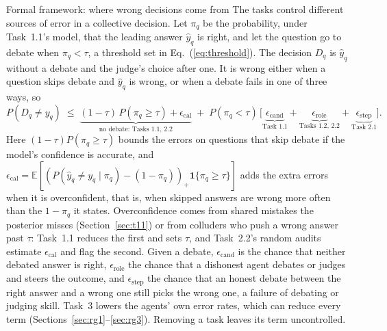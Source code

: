 \documentclass[12pt,letterpaper]{article}
\begin{document}
\begin{keybox}{Formal framework: where wrong decisions come from}\label{sec:framework}%
The tasks control different sources of error in a collective decision. Let $\pi_q$ be the probability, under Task~1.1's model, that the leading answer $\hat y_q$ is right, and let the question go to debate when $\pi_q<\tau$, a threshold set in Eq.~(\ref{eq:threshold}). The decision $D_q$ is $\hat y_q$ without a debate and the judge's choice after one. It is wrong either when a question skips debate and $\hat y_q$ is wrong, or when a debate fails in one of three ways, so
\begin{equation}
P(D_q\neq y_q)\;\le\;\underbrace{(1-\tau)\,P(\pi_q\ge\tau)+\epsilon_{\text{cal}}}_{\text{no debate: Tasks 1.1, 2.2}}\;+\;P(\pi_q<\tau)\,\big[\underbrace{\epsilon_{\text{cand}}}_{\text{Task 1.1}}+\underbrace{\epsilon_{\text{role}}}_{\text{Tasks 1.2, 2.2}}+\underbrace{\epsilon_{\text{step}}}_{\text{Task 2.1}}\big].
\label{eq:decomp}
\end{equation}
Here $(1-\tau)P(\pi_q\ge\tau)$ bounds the errors on questions that skip debate if the model's confidence is accurate, and $\epsilon_{\text{cal}}=\mathbb{E}[(P(\hat y_q\neq y_q\mid\pi_q)-(1-\pi_q))_+\mathbf{1}\{\pi_q\ge\tau\}]$ adds the extra errors when it is overconfident, that is, when skipped answers are wrong more often than the $1-\pi_q$ it states. Overconfidence comes from shared mistakes the posterior misses (Section~\ref{sec:t11}) or from colluders who push a wrong answer past $\tau$: Task~1.1 reduces the first and sets $\tau$, and Task~2.2's random audits estimate $\epsilon_{\text{cal}}$ and flag the second. Given a debate, $\epsilon_{\text{cand}}$ is the chance that neither debated answer is right, $\epsilon_{\text{role}}$ the chance that a dishonest agent debates or judges and steers the outcome, and $\epsilon_{\text{step}}$ the chance that an honest debate between the right answer and a wrong one still picks the wrong one, a failure of debating or judging skill. Task~3 lowers the agents' own error rates, which can reduce every term (Sections~\ref{sec:rg1}--\ref{sec:rg3}). Removing a task leaves its term uncontrolled.
\end{keybox}
\end{document}
